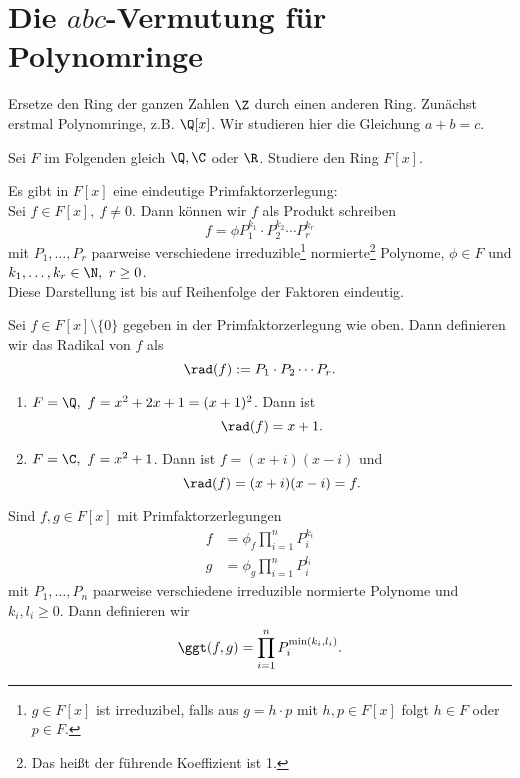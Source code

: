 \section{Die $abc$-Vermutung für Polynomringe}
\begin{idee*}
	Ersetze den Ring der ganzen Zahlen $\Z$ durch einen anderen Ring. Zunächst erstmal Polynomringe, z.B. $\Q[x]$. Wir studieren hier die Gleichung $a+b=c$.
\end{idee*}

Sei $F$ im Folgenden gleich $\Q,\C$ oder $\R$. Studiere den Ring $F[x]$.

\begin{rem*}
	Es gibt in $F[x]$ eine eindeutige Primfaktorzerlegung:\\
	Sei $f \in F[x],\ f \neq 0$. Dann können wir $f$ als Produkt schreiben
	\[ f = \phi P_1^{k_1} \cdot P_2^{k_2} \dotsm P_r^{k_r} \]
	mit $P_1,\dotsc,P_r$ paarweise verschiedene irreduzible\footnote{$g \in F[x]$ ist irreduzibel, falls aus $g = h \cdot p$ mit $h,p \in F[x]$ folgt $h \in F$ oder $p \in F$.} normierte\footnote{Das heißt der führende Koeffizient ist 1.} Polynome, $\phi \in F$ und $k_1,\dotsc,k_r \in \N,\ r \geq 0$.\\
	Diese Darstellung ist bis auf Reihenfolge der Faktoren eindeutig.
\end{rem*}

\begin{defn*}
	Sei $f \in F[x] \setminus\{0\}$ gegeben in der Primfaktorzerlegung wie oben. Dann definieren wir das Radikal von $f$ als
	\[ \rad(f) := P_1 \cdot P_2 \dotsm P_r. \]
\end{defn*}

\begin{exmp*}
	\begin{enumerate}[label={\roman*})]
		\item $F=\Q,\ f = x^2+2x+1 = (x+1)^2$. Dann ist \[ \rad(f) = x+1. \]
		\item $F = \C,\ f = x^2+1$. Dann ist $f = (x+i)(x-i)$ und \[ \rad(f) = (x+i)(x-i) = f. \]
	\end{enumerate}
\end{exmp*}

\begin{defn*}
	Sind $f,g \in F[x]$ mit Primfaktorzerlegungen
	\begin{align*}
		f &= \phi_f \prod_{i=1}^n P_i^{k_i}\\
		g &= \phi_g \prod_{i=1}^n P_i^{l_i}
	\end{align*}
	mit $P_1,\dotsc,P_n$ paarweise verschiedene irreduzible normierte Polynome und $k_i,l_i \geq 0$. Dann definieren wir
	\[ \ggt(f,g) = \prod_{i=1}^n P_i^{\min(k_i,l_i)}. \]
\end{defn*}

